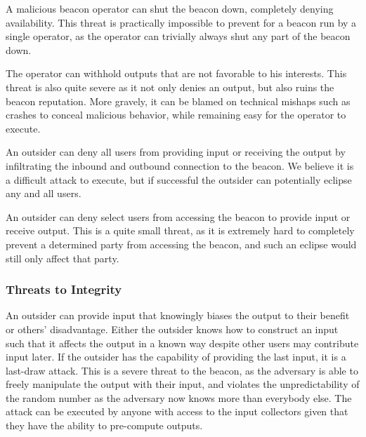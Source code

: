 A malicious beacon operator can shut the beacon down, completely denying availability.
This threat is practically impossible to prevent for a beacon run by a single operator, as the operator can trivially always shut any part of the beacon down.

The operator can withhold outputs that are not favorable to his interests.
This threat is also quite severe as it not only denies an output, but also ruins the beacon reputation.
More gravely, it can be blamed on technical mishaps such as crashes to conceal malicious behavior, while remaining easy for the operator to execute.

An outsider can deny all users from providing input or receiving the output by infiltrating the inbound and outbound connection to the beacon.
We believe it is a difficult attack to execute, but if successful the outsider can potentially eclipse any and all users.

An outsider can deny select users from accessing the beacon to provide input or receive output.
This is a quite small threat, as it is extremely hard to completely prevent a determined party from accessing the beacon, and such an eclipse would still only affect that party.

\subsubsection{Threats to Integrity}


An outsider can provide input that knowingly biases the output to their benefit or others' disadvantage.
Either the outsider knows how to construct an input such that it affects the output in a known way despite other users may contribute input later.
If the outsider has the capability of providing the last input, it is a last-draw attack.
This is a severe threat to the beacon, as the adversary is able to freely manipulate the output with their input, and violates the unpredictability of the random number as the adversary now knows more than everybody else.
The attack can be executed by anyone with access to the input collectors given that they have the ability to pre-compute outputs.

